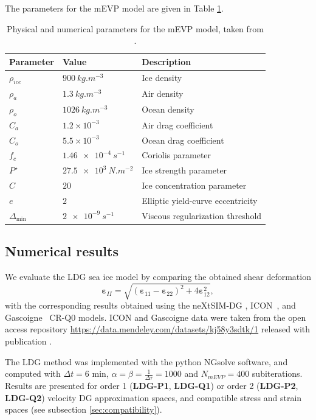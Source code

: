 \documentclass[11pt]{article}
\newcommand{\beps}{\boldsymbol{\varepsilon}}
\begin{document}
The parameters for the mEVP model are given in Table \ref{tab:mevp_parameters}. \begin{table}[h]
\centering
\caption{Physical and numerical parameters for the mEVP model, taken from \cite{MehlmannLKF2021}.}
\label{tab:mevp_parameters}
\begin{tabular}{lll}
\toprule
Parameter & Value & Description \\
\midrule
$\rho_{ice}$ & $\SI{900}{kg.m^{-3}}$ & Ice density \\
$\rho_a$ & $\SI{1.3}{kg.m^{-3}}$ & Air density \\
$\rho_o$ & $\SI{1026}{kg.m^{-3}}$ & Ocean density \\
$C_a$ & $1.2\times 10^{-3}$ & Air drag coefficient \\
$C_o$ & $5.5\times 10^{-3}$ & Ocean drag coefficient \\
$f_c$ & $\SI{1.46e-4}{s^{-1}}$ & Coriolis parameter \\
$P^\star$ & $\SI{27.5e3}{N.m^{-2}}$ & Ice strength parameter \\
$C$ & $20$ & Ice concentration parameter \\
$e$ & $2$ & Elliptic yield-curve eccentricity \\
$\Delta_{\min}$ & $\SI{2e-9}{s^{-1}}$ & Viscous regularization threshold \\
\bottomrule
\end{tabular}
\end{table}


\subsection{Numerical results}
We evaluate the LDG sea ice model by comparing the obtained shear deformation
$$\beps_{II} = \sqrt{(\beps_{11} - \beps_{22})^2 + 4 \beps_{12}^2},
$$with the corresponding results obtained using the neXtSIM-DG \cite{richter2023dynamical}, ICON~\cite{Mehlmann2021,iconorg}, and Gascoigne~\cite{Braack2021} CR-Q0 models. ICON and Gascoigne data were taken from the open access repository \url{https://data.mendeley.com/datasets/kj58y3sdtk/1} released with publication \cite{MehlmannLKF2021}. 

The LDG method was implemented with the python NGsolve software, and computed with $\Delta t=6$ min, $\alpha = \beta = \frac{1}{\Delta \tau} = 1000$ and $N_{mEVP} = 400$ subiterations. Results are presented for order 1 (\textbf{LDG-P1}, \textbf{LDG-Q1}) or order 2 (\textbf{LDG-P2}, \textbf{LDG-Q2}) velocity DG approximation spaces, and compatible stress and strain spaces (see subsection \ref{sec:compatibility}).
\end{document}
